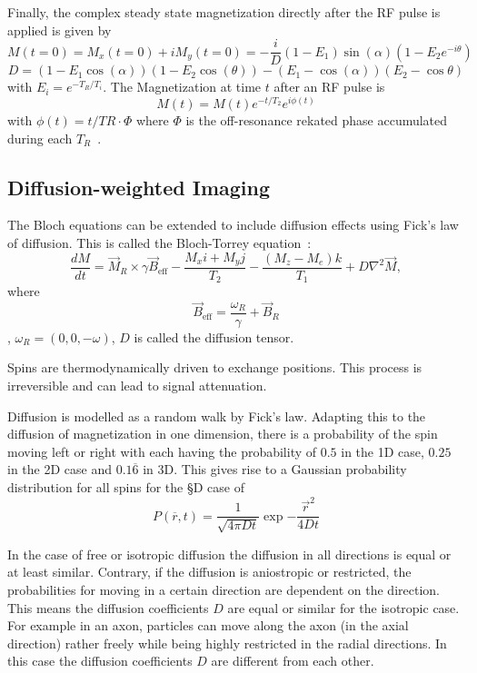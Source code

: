 Finally, the complex steady state magnetization directly after the RF pulse is applied is given by
\[ M(t = 0) = M_x(t = 0) + iM_y(t = 0) = -\frac{i}{D} (1 - E_1) \sin(\alpha)  (1 - E_2 e^{-i \theta}) \]
\[ D = (1 - E_1 \cos(\alpha)) (1 - E_2 \cos(\theta)) - (E_1 - \cos(\alpha)) (E_2 - \cos{\theta}) \]
with $E_i = e^{-T_R / T_i}$.
The Magnetization at time $t$ after an RF pulse is
\[ M(t) = M(t) e^{-t / T_2} e^{i \phi(t)} \]
with $\phi(t) = t / TR \cdot \Phi$ where $\Phi$ is the off-resonance rekated phase accumulated during each $T_R$~\autocite{nguyen_motion-insensitive_2017, ganter_steady_2006}.


\subsection{Diffusion-weighted Imaging}
The Bloch equations can be extended to include diffusion effects using Fick's law of diffusion.
This is called the Bloch-Torrey equation~\autocite{torrey_bloch_1956}:
\[ \frac{dM}{dt} = \overrightarrow{M}_R \times \gamma \overrightarrow{B}_{\text{eff}} - \frac{M_{x} i + M_{y} j}{T_2} - \frac{(M_z - M_e) k }{T_1} + D\nabla^2 \overrightarrow{M}, \]
where \[ \overrightarrow{B}_{\text{eff}} = \frac{\omega_R}{\gamma} + \overrightarrow{B}_R \], $\omega_R = \left( 0, 0, - \omega \right)$, $D$ is called the diffusion tensor.

Spins are thermodynamically driven to exchange positions.
This process is irreversible and can lead to signal attenuation.

Diffusion is modelled as a random walk by Fick's law.
Adapting this to the diffusion of magnetization in one dimension, there is a probability of the spin moving left or right with each having the probability of $0.5$ in the 1D case, $0.25$ in the 2D case and $0.1\overline{6}$ in 3D.
This gives rise to a Gaussian probability distribution for all spins for the §D case of
\[ P(\overline{r}, t) = \frac{1}{\sqrt{4 \pi D t}} \exp{- \frac{\overrightarrow{r}^2}{4Dt}} \]

In the case of free or isotropic diffusion the diffusion in all directions is equal or at least similar.
Contrary, if the diffusion is aniostropic or restricted, the probabilities for moving in a certain direction are dependent on the direction.
This means the diffusion coefficients $D$ are equal or similar for the isotropic case.
For example in an axon, particles can move along the axon (in the axial direction) rather freely while being highly restricted in the radial directions.
In this case the diffusion coefficients $D$ are different from each other. \\

